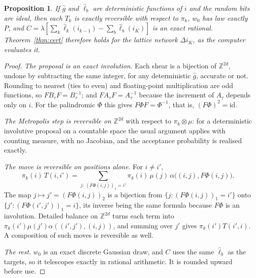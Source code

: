 \documentclass[11pt]{article}
\newtheorem{proposition}[theorem]{Proposition}
\theoremstyle{definition}
\theoremstyle{remark}
\newcommand{\Z}{\mathbb{Z}}
\begin{document}
\begin{proposition}\label{prop:exact}
If $\hat g$ and $\hat\ell_b$ are deterministic functions of $i$ and the random bits are ideal, then each $T_k$ is exactly
reversible with respect to $\pi_k$, $w_0$ has law exactly $P$, and $C=\lambda[\sum_k\hat\ell_k(i_{k-1})-\sum_b\hat\ell_b(i_K)]$
is an exact rational. Theorem~\ref{thm:cert} therefore holds for the lattice network $\Delta i_K$, as the computer
evaluates it.
\end{proposition}
\begin{proof}
\emph{The proposal is an exact involution.} Each shear is a bijection of $\Z^{2d}$, undone by subtracting the same
integer, for any deterministic $\hat g$, accurate or not. Rounding to nearest (ties to even) and floating-point
multiplication are odd functions, so $FB_\tau F=B_\tau^{-1}$; and $FA_\tau F=A_\tau^{-1}$ because the increment of $A_\tau$
depends only on $i$. For the palindromic $\Phi$ this gives $F\Phi F=\Phi^{-1}$, that is, $(F\Phi)^2=\mathrm{id}$.

\emph{The Metropolis step is reversible on $\Z^{2d}$} with respect to $\pi_k\otimes\mu$: for a deterministic involutive
proposal on a countable space the usual argument applies with counting measure, with no Jacobian, and the acceptance
probability is realised exactly.

\emph{The move is reversible on positions alone.} For $i\neq i'$,
\[
\pi_k(i)\,T(i,i')=\sum_{j:\,(F\Phi(i,j))_1=i'}\pi_k(i)\,\mu(j)\,\alpha\big((i,j),F\Phi(i,j)\big).
\]
The map $j\mapsto j'=(F\Phi(i,j))_2$ is a
bijection from $\{j:(F\Phi(i,j))_1=i'\}$ onto $\{j':(F\Phi(i',j'))_1=i\}$, its inverse being the same formula because $F\Phi$ is
an involution. Detailed balance on $\Z^{2d}$ turns each term into $\pi_k(i')\mu(j')\alpha((i',j'),(i,j))$, and summing over $j'$
gives $\pi_k(i')T(i',i)$. A composition of such moves is reversible as well.

\emph{The rest.} $w_0$ is an exact discrete Gaussian draw, and $C$ uses the same $\hat\ell_b$ as the targets, so it
telescopes exactly in rational arithmetic. It is rounded upward before use.
\end{proof}
\end{document}
